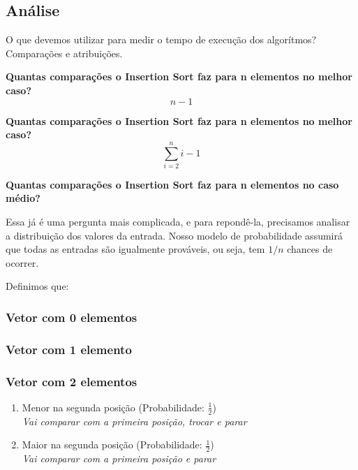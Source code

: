 \documentclass{article}
\begin{document}
\subsection{Análise}
\textnormal{O que devemos utilizar para medir o tempo de execução dos algorítmos? Comparações e atribuições.}

\textbf{Quantas comparações o Insertion Sort faz para n elementos no melhor caso?}
\begin{equation}
n - 1
\end{equation}

\textbf{Quantas comparações o Insertion Sort faz para n elementos no melhor caso?} 
\begin{equation}
    \sum_{i=2}^{n} i-1
\end{equation}

\textbf{Quantas comparações o Insertion Sort faz para n elementos no caso médio?}

\textnormal{Essa já é uma pergunta mais complicada, e para repondê-la, precisamos analisar a distribuição dos valores da entrada. Nosso modelo de probabilidade assumirá que todas as entradas são igualmente prováveis, ou seja, tem $1/n$ chances de ocorrer.}

\textnormal{Definimos que:\\}
\indent  {}


\subsubsection{Vetor com 0 elementos}
\indent {}


\subsubsection{Vetor com 1 elemento}
\indent {}


\subsubsection{Vetor com 2 elementos}
\begin{enumerate}
\item {Menor na segunda posição (Probabilidade: $\frac{1}{2}$)\\}
    \em{Vai comparar com a primeira posição, trocar e parar}
\item {Maior na segunda posição (Probabilidade: $\frac{1}{2}$)\\}
    \em{Vai comparar com a primeira posição e parar}
\end{enumerate}
\end{document}
